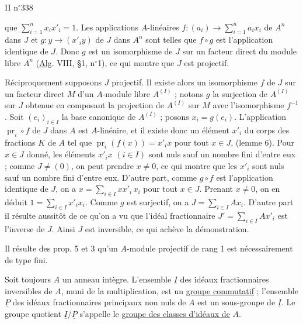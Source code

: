 II  \hfill n$^\circ$338

que $\displaystyle\sum_{i=1}^{n}x_i x'_i=1$. Les applications $A$-linéaires $f:(a_i)\to\displaystyle\sum_{i=1}^{n}a_i x_i$ de $A^n$ dans $J$ et $g:y\to(x'_i y)$ de $J$ dans $A^n$ sont telles que $f\circ g$ est l'application identique de $J$. Donc $g$ est un isomorphisme de $J$ sur un facteur direct du module libre $A^n$ (\uline{Alg}. VIII, \S 1, n$^\circ$1), ce qui montre que $J$ est projectif.

Réciproquement supposons $J$ projectif. Il existe alors un isomorphisme $f$ de $J$ sur un facteur direct $M$ d'un $A$-module libre $A^{(I)}$ ; notons $g$ la surjection de $A^{(I)}$ sur $J$ obtenue en composant la projection de $A^{(I)}$ sur $M$ avec l'isomorphisme $f^{-1}$. Soit $(e_i)_{i\in I}$ la base canonique de $A^{(I)}$ ; posons $x_i=g(e_i)$. L'application $\operatorname{pr}_i\circ f$ de $J$ dans $A$ est $A$-linéaire, et il existe donc un élément $x'_i$ du corps des fractions $K$ de $A$ tel que $\operatorname{pr}_i(f(x))=x'_i x$ pour tout $x\in J$, (lemme 6). Pour $x\in J$ donné, les éléments $x'_i x$ $(i\in I)$ sont nuls sauf un nombre fini d'entre eux ; comme $J\ne(0)$, on peut prendre $x\ne0$, ce qui montre que les $x'_i$ sont nuls sauf un nombre fini d'entre eux. D'autre part, comme $g\circ f$ est l'application identique de $J$, on a $x=\displaystyle\sum_{i\in I}xx'_i\,x_i$ pour tout $x\in J$. Prenant $x\ne0$, on en déduit $1=\displaystyle\sum_{i\in I}x'_i x_i$. Comme $g$ est surjectif, on a $J=\displaystyle\sum_{i\in I}Ax_i$. D'autre part il résulte aussitôt de ce qu'on a vu que l'idéal fractionnaire $J'=\displaystyle\sum_{i\in I}Ax'_i$ est l'inverse de $J$. Ainsi $J$ est inversible, ce qui achève la démonstration.

Il résulte des prop. 5 et 3 qu'un $A$-module projectif de rang 1 est nécessairement de type fini.

Soit toujours $A$ un anneau intègre. L'ensemble $\underline I$ des idéaux fractionnaires inversibles de $A$, muni de la multiplication, est un \uline{groupe commutatif} ; l'ensemble $\underline P$ des idéaux fractionnaires principaux non nuls de $A$ est un sous-groupe de $\underline I$. Le groupe quotient $\underline I/\underline P$ s'appelle le \uline{groupe des classes d'idéaux de} $A$.
